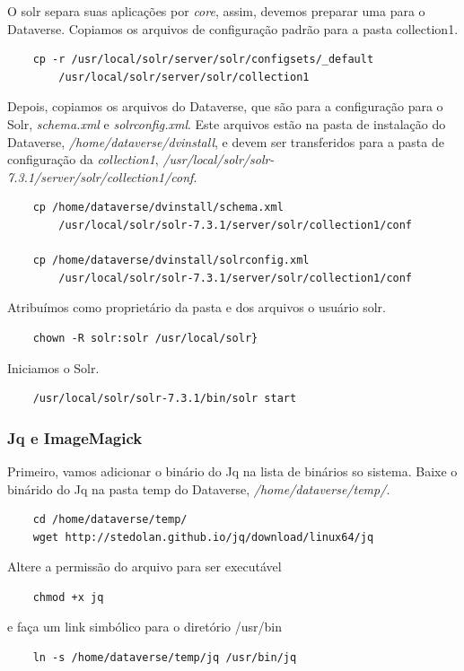 \documentclass[12pt,hidelinks]{article}
\begin{document}
        O solr separa suas aplicações por \textit{core}, assim, devemos preparar uma para o Dataverse. Copiamos os arquivos de configuração padrão para a pasta collection1.
        \begin{verbatim}
    cp -r /usr/local/solr/server/solr/configsets/_default 
        /usr/local/solr/server/solr/collection1
        \end{verbatim}
        Depois, copiamos os arquivos do Dataverse, que são para a configuração para o Solr, \textit{schema.xml} e \textit{solrconfig.xml}. Este arquivos estão na pasta de instalação do Dataverse, \textit{/home/dataverse/dvinstall}, e devem ser transferidos para a pasta de configuração da \textit{collection1}, \textit{/usr/local/solr/solr-7.3.1/server/solr/collection1/conf}.
        \begin{verbatim}
    cp /home/dataverse/dvinstall/schema.xml 
        /usr/local/solr/solr-7.3.1/server/solr/collection1/conf
        
    cp /home/dataverse/dvinstall/solrconfig.xml 
        /usr/local/solr/solr-7.3.1/server/solr/collection1/conf
        \end{verbatim}
        Atribuímos como proprietário da pasta e dos arquivos o usuário solr.
        \begin{verbatim}
    chown -R solr:solr /usr/local/solr}
        \end{verbatim}
        
        Iniciamos o Solr.
        \begin{verbatim}
    /usr/local/solr/solr-7.3.1/bin/solr start
        \end{verbatim}
        
        \subsubsection{Jq e ImageMagick}
        
        Primeiro, vamos adicionar o binário do Jq na lista de binários so sistema. Baixe o binárido do Jq na pasta temp do Dataverse, \textit{/home/dataverse/temp/}.
        \begin{verbatim}
    cd /home/dataverse/temp/
    wget http://stedolan.github.io/jq/download/linux64/jq
        \end{verbatim}
        Altere a permissão do arquivo para ser executável
        \begin{verbatim}
    chmod +x jq
        \end{verbatim}
        e faça um link simbólico para o diretório /usr/bin
        \begin{verbatim}
    ln -s /home/dataverse/temp/jq /usr/bin/jq
        \end{verbatim}
        
\end{document}
